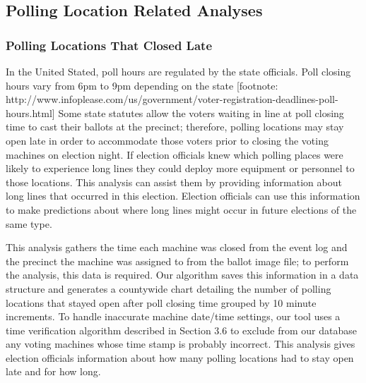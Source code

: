 \subsection{Polling Location Related Analyses}
\subsubsection{Polling Locations That Closed Late}
In the United Stated, poll hours are regulated by the state officials. Poll closing hours vary from 6pm to 9pm depending on the state [footnote: http://www.infoplease.com/us/government/voter-registration-deadlines-poll-hours.html] Some state statutes allow the voters waiting in line at poll closing time to cast their ballots at the precinct; therefore,  polling locations may stay open late in order to accommodate those voters prior to closing the voting machines on election night. If election officials knew which polling places were likely to experience long lines they could deploy more equipment or personnel to those locations. This analysis can assist them by providing information about long lines that occurred in this election. Election officials can use this information to make predictions about where long lines might occur in future elections of the same type.

This analysis gathers the time each machine was closed from the event log and the precinct the machine was assigned to from the ballot image file; to perform the analysis, this data is required.  Our algorithm saves this information in a data structure and generates a countywide chart detailing the number of polling locations that stayed open after poll closing time grouped by 10 minute increments. To handle inaccurate machine date/time settings, our tool uses a time verification algorithm described in Section 3.6 to exclude from our database any voting machines whose time stamp is probably incorrect. This analysis gives election officials information about how many polling locations had to stay open late and for how long.


